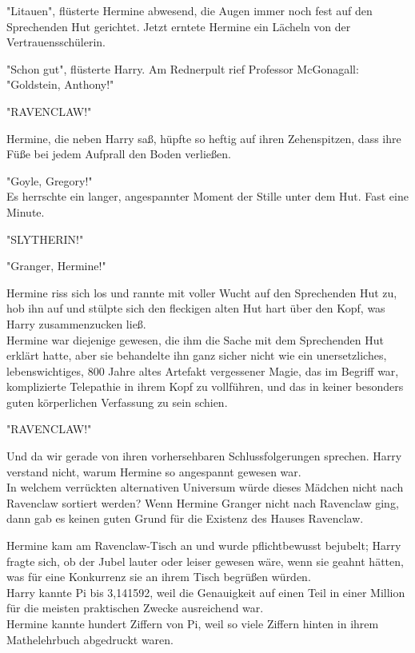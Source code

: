 {"Litauen", flüsterte Hermine abwesend, die Augen immer noch fest auf den Sprechenden Hut gerichtet. Jetzt erntete Hermine ein Lächeln von der Vertrauensschülerin.

"Schon gut", flüsterte Harry. Am Rednerpult rief Professor McGonagall:\\ "Goldstein, Anthony!"

"RAVENCLAW!"

Hermine, die neben Harry saß, hüpfte so heftig auf ihren Zehenspitzen, dass ihre Füße bei jedem Aufprall den Boden verließen.

"Goyle, Gregory!"\\ Es herrschte ein langer, angespannter Moment der Stille unter dem Hut. Fast eine Minute.

"SLYTHERIN!"

"Granger, Hermine!"

Hermine riss sich los und rannte mit voller Wucht auf den Sprechenden Hut zu, hob ihn auf und stülpte sich den fleckigen alten Hut hart über den Kopf, was Harry zusammenzucken ließ.\\ Hermine war diejenige gewesen, die ihm die Sache mit dem Sprechenden Hut erklärt hatte, aber sie behandelte ihn ganz sicher nicht wie ein unersetzliches, lebenswichtiges, 800 Jahre altes Artefakt vergessener Magie, das im Begriff war, komplizierte Telepathie in ihrem Kopf zu vollführen, und das in keiner besonders guten körperlichen Verfassung zu sein schien.

"RAVENCLAW!"

Und da wir gerade von ihren vorhersehbaren Schlussfolgerungen sprechen. Harry verstand nicht, warum Hermine so angespannt gewesen war.\\ In welchem verrückten alternativen Universum würde dieses Mädchen nicht nach Ravenclaw sortiert werden? Wenn Hermine Granger nicht nach Ravenclaw ging, dann gab es keinen guten Grund für die Existenz des Hauses Ravenclaw.

Hermine kam am Ravenclaw-Tisch an und wurde pflichtbewusst bejubelt; Harry fragte sich, ob der Jubel lauter oder leiser gewesen wäre, wenn sie geahnt hätten, was für eine Konkurrenz sie an ihrem Tisch begrüßen würden.\\ Harry kannte Pi bis 3,141592, weil die Genauigkeit auf einen Teil in einer Million für die meisten praktischen Zwecke ausreichend war.\\ Hermine kannte hundert Ziffern von Pi, weil so viele Ziffern hinten in ihrem Mathelehrbuch abgedruckt waren.

}
